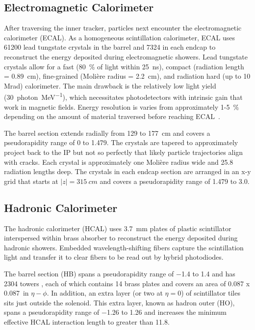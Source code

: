 \documentclass[12pt]{article}
\begin{document}
    \subsection{Electromagnetic Calorimeter}
        After traversing the inner tracker, particles next encounter the electromagnetic calorimeter (ECAL). As a homogeneous scintillation calorimeter, ECAL uses \num{61200} lead tungstate crystals in the barrel and \num{7324} in each endcap to reconstruct the energy deposited during electromagnetic showers. Lead tungstate crystals allow for a fast (\SI{80}{\percent} of light within \SI{25}{\nano\s}), compact (radiation length = \SI{0.89}{cm}), fine-grained (Moli\`ere radius = \SI{2.2}{cm}), and radiation hard (up to 10 Mrad) calorimeter. The main drawback is the relatively low light yield (\SI{30}{photon\per\mega\electronvolt}), which necessitates photodetectors with intrinsic gain that work in magnetic fields\cite{cms_experiment, cms_tdr}. Energy resolution is varies from approximately \num{1}-\SI{5}{\percent} depending on the amount of material traversed before reaching ECAL~\cite{ecal_performance}.

        The barrel section extends radially from \num{129} to \SI{177}{cm} and covers a pseudorapidity range of \num{0} to \num{1.479}. The crystals are tapered to approximately project back to the IP but not so perfectly that likely particle trajectories align with cracks. Each crystal is approximately one Moli\`ere radius wide and 25.8 radiation lengths deep. The crystals in each endcap section are arranged in an x-y grid that starts at $\lvert z \rvert = \SI{315}{cm}$ and covers a pseudorapidity range of \num{1.479} to \num{3.0}.

    \subsection{Hadronic Calorimeter}
        The hadronic calorimeter (HCAL) uses \SI{3.7}{mm} plates of plastic scintillator interspersed within brass absorber to reconstruct the energy deposited during hadronic showers. Embedded wavelength-shifting fibers capture the scintillation light and transfer it to clear fibers to be read out by hybrid photodiodes\cite{cms_experiment, cms_tdr}.

        The barrel section (HB) spans a pseudorapidity range of \num{-1.4} to \num{1.4} and has \num{2304} towers , each of which contains \num{14}  brass plates and covers an area of \num{0.087} x \SI{0.087}{in} $\eta-\phi$. In addition, an extra layer (or two at $\eta = \num{0}$) of scintillator tiles sits just outside the solenoid. This extra layer, known as hadron outer (HO), spans a pseudorapidity range of \num{-1.26} to \num{1.26} and increases the minimum effective HCAL interaction length to greater than \num{11.8}.
\end{document}
